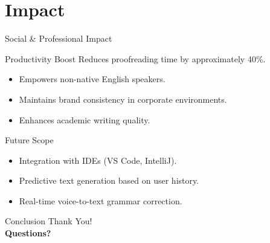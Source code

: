 \documentclass{beamer}
\begin{document}
\section{Impact}
\begin{frame}{Social \& Professional Impact}
    \begin{alertblock}{Productivity Boost}
        Reduces proofreading time by approximately 40\%.
    \end{alertblock}
    \begin{itemize}
        \item Empowers non-native English speakers.
        \item Maintains brand consistency in corporate environments.
        \item Enhances academic writing quality.
    \end{itemize}
\end{frame}

\begin{frame}{Future Scope}
    \begin{itemize}
        \item Integration with IDEs (VS Code, IntelliJ).
        \item Predictive text generation based on user history.
        \item Real-time voice-to-text grammar correction.
    \end{itemize}
\end{frame}

\begin{frame}{Conclusion}
    \centering
    \Huge Thank You! \\
    \vspace{10pt}
    \normalsize \textbf{Questions?}
\end{frame}
\end{document}
